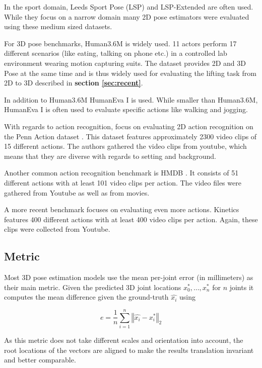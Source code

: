 \documentclass[twoside]{article}
\begin{document}
\begin{multicols}{2}
In the sport domain, Leeds Sport Pose (LSP) \cite{johnson_clustered_2010} and LSP-Extended \cite{johnson_learning_2011} are often used.
While they focus on a narrow domain many 2D pose estimators were evaluated using these medium sized datasets.

For 3D pose benchmarks, Human3.6M \cite{ionescu_human3.6m:_2014} is widely used.
11 actors perform 17 different scenarios (like eating, talking on phone etc.) in a controlled lab environment wearing motion capturing suits.
The dataset provides 2D and 3D Pose at the same time and is thus widely used for evaluating the lifting task from 2D to 3D described in \textbf{section \ref{sec:recent}}.

In addition to Human3.6M HumanEva I \cite{sigal_humaneva:_2010} is used.
While smaller than Human3.6M, HumanEva I is often used to evaluate specific actions like walking and jogging.

With regards to action recognition, \cite{luvizon_2d/3d_2018} focus on evaluating 2D action recognition on the Penn Action dataset \cite{zhang_actemes_2013}.
This dataset features approximately 2300 video clips of 15 different actions.
The authors gathered the video clips from youtube, which means that they are diverse with regards to setting and background.

Another common action recognition benchmark is HMDB \cite{kuehne_hmdb:_2011}.
It consists of 51 different actions with at least 101 video clips per action.
The video files were gathered from Youtube as well as from movies.

A more recent benchmark focuses on evaluating even more actions. Kinetics \cite{kay_kinetics_2017} features 400 different actions with at least 400 video clips per action. Again, these clips were collected from Youtube.


\subsection{Metric}

Most 3D pose estimation models use the mean per-joint error (in millimeters) as their main metric.
Given the predicted 3D joint locations $x_0^{*}, \dots, x_n^{*}$ for $n$ joints it computes the mean difference given the ground-truth $\hat{x_i}$ using

\newcommand\norm[1]{\left\Vert#1\right\Vert}

\[
    e = \frac{1}{n} \sum_{i=1}^{n} \norm{\hat{x_i} - x_i^{*}}_2
\]

As this metric does not take different scales and orientation into account, the root locations of the vectors are aligned to make the results translation invariant and better comparable.


\end{multicols}
\end{document}

